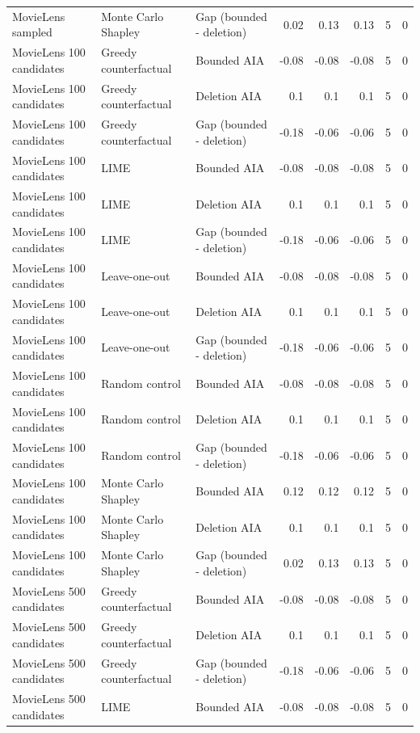 \begin{table}[t]
{\begin{tabular}{lllrrrrr}
MovieLens sampled & Monte Carlo Shapley & Gap (bounded - deletion) & 0.02 & 0.13 & 0.13 & 5 & 0 \\
MovieLens 100 candidates & Greedy counterfactual & Bounded AIA & -0.08 & -0.08 & -0.08 & 5 & 0 \\
MovieLens 100 candidates & Greedy counterfactual & Deletion AIA & 0.1 & 0.1 & 0.1 & 5 & 0 \\
MovieLens 100 candidates & Greedy counterfactual & Gap (bounded - deletion) & -0.18 & -0.06 & -0.06 & 5 & 0 \\
MovieLens 100 candidates & LIME & Bounded AIA & -0.08 & -0.08 & -0.08 & 5 & 0 \\
MovieLens 100 candidates & LIME & Deletion AIA & 0.1 & 0.1 & 0.1 & 5 & 0 \\
MovieLens 100 candidates & LIME & Gap (bounded - deletion) & -0.18 & -0.06 & -0.06 & 5 & 0 \\
MovieLens 100 candidates & Leave-one-out & Bounded AIA & -0.08 & -0.08 & -0.08 & 5 & 0 \\
MovieLens 100 candidates & Leave-one-out & Deletion AIA & 0.1 & 0.1 & 0.1 & 5 & 0 \\
MovieLens 100 candidates & Leave-one-out & Gap (bounded - deletion) & -0.18 & -0.06 & -0.06 & 5 & 0 \\
MovieLens 100 candidates & Random control & Bounded AIA & -0.08 & -0.08 & -0.08 & 5 & 0 \\
MovieLens 100 candidates & Random control & Deletion AIA & 0.1 & 0.1 & 0.1 & 5 & 0 \\
MovieLens 100 candidates & Random control & Gap (bounded - deletion) & -0.18 & -0.06 & -0.06 & 5 & 0 \\
MovieLens 100 candidates & Monte Carlo Shapley & Bounded AIA & 0.12 & 0.12 & 0.12 & 5 & 0 \\
MovieLens 100 candidates & Monte Carlo Shapley & Deletion AIA & 0.1 & 0.1 & 0.1 & 5 & 0 \\
MovieLens 100 candidates & Monte Carlo Shapley & Gap (bounded - deletion) & 0.02 & 0.13 & 0.13 & 5 & 0 \\
MovieLens 500 candidates & Greedy counterfactual & Bounded AIA & -0.08 & -0.08 & -0.08 & 5 & 0 \\
MovieLens 500 candidates & Greedy counterfactual & Deletion AIA & 0.1 & 0.1 & 0.1 & 5 & 0 \\
MovieLens 500 candidates & Greedy counterfactual & Gap (bounded - deletion) & -0.18 & -0.06 & -0.06 & 5 & 0 \\
MovieLens 500 candidates & LIME & Bounded AIA & -0.08 & -0.08 & -0.08 & 5 & 0 \\

\end{tabular}}
\end{table}
